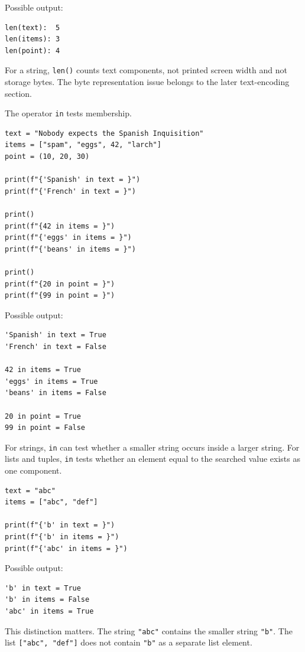 Possible output:

\begin{verbatim}
len(text):  5
len(items): 3
len(point): 4
\end{verbatim}

For a string, \texttt{len()} counts text components, not printed screen width and not storage bytes. The byte representation issue belongs to the later text-encoding section.

The operator \texttt{in} tests membership.

\begin{verbatim}
text = "Nobody expects the Spanish Inquisition"
items = ["spam", "eggs", 42, "larch"]
point = (10, 20, 30)

print(f"{'Spanish' in text = }")
print(f"{'French' in text = }")

print()
print(f"{42 in items = }")
print(f"{'eggs' in items = }")
print(f"{'beans' in items = }")

print()
print(f"{20 in point = }")
print(f"{99 in point = }")
\end{verbatim}

Possible output:

\begin{verbatim}
'Spanish' in text = True
'French' in text = False

42 in items = True
'eggs' in items = True
'beans' in items = False

20 in point = True
99 in point = False
\end{verbatim}

For strings, \texttt{in} can test whether a smaller string occurs inside a larger string. For lists and tuples, \texttt{in} tests whether an element equal to the searched value exists as one component.

\begin{verbatim}
text = "abc"
items = ["abc", "def"]

print(f"{'b' in text = }")
print(f"{'b' in items = }")
print(f"{'abc' in items = }")
\end{verbatim}

Possible output:

\begin{verbatim}
'b' in text = True
'b' in items = False
'abc' in items = True
\end{verbatim}

This distinction matters. The string \texttt{"abc"} contains the smaller string \texttt{"b"}. The list \texttt{["abc", "def"]} does not contain \texttt{"b"} as a separate list element.

